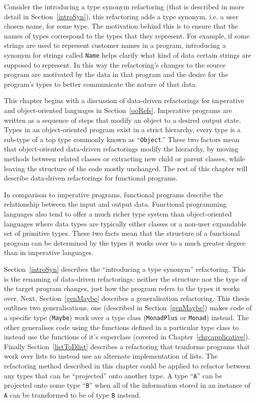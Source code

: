 Consider the introducing a type synonym refactoring (that is described in  more detail in Section~\ref{introSyn}), this refactoring adds a type synonym, i.e. a user chosen name, for some type. The motivation behind this is to ensure that the names of types correspond to the types that they represent. For example, if some strings are used to represent customer names in a program, introducing a synonym for strings called \texttt{Name} helps clarify what kind of data certain strings are supposed to represent. In this way the refactoring's changes to the source program are motivated by the data in that program and the desire for the program's types to better communicate the nature of that data.

This chapter begins with a discussion of data-driven refactorings for imperative and object-oriented languages in Section~\ref{ooRefs}. Imperative programs are written as a sequence of steps that modify an object to a desired output state. Types in an object-oriented program exist in a strict hierarchy, every type is a sub-type of a top type commonly known as ``\texttt{Object}.'' These two factors mean that object-oriented data-driven refactorings modify the hierarchy, by moving methods between related classes or extracting new child or parent classes, while leaving the structure of the code mostly unchanged. The rest of this chapter will describe data-driven refactorings for functional programs.

In comparison to imperative programs, functional programs describe the relationship between the input and output data. Functional programming languages also tend to offer a much richer type system than object-oriented languages where data types are typically either classes or a non-user expandable set of primitive types. These two facts mean that the structure of a functional program can be determined by the types it works over to a much greater degree than in imperative languages.

Section~\ref{introSyn} describes the ``introducing a type synonym'' refactoring. This is the renaming of data-driven refactorings: neither the structure nor the type of the target program changes, just how the program refers to the types it works over. Next, Section~\ref{genMaybe} describes a generalisation refactoring. This thesis outlines two generalisations, one (described in Section~\ref{genMaybe}) makes code of a specific type (\texttt{Maybe}) work over a type class (\texttt{MonadPlus} or \texttt{Monad}) instead. The other generalises code using the functions defined in a particular type class to instead use the functions of it's superclass (covered in Chapter~\ref{chp:applicative}). Finally Section~\ref{listToDlist} describes a refactoring that tranforms programs that work over lists to instead use an alternate implementation of lists. The refactoring method described in this chapter could be applied to refactor between any types that can be ``projected'' onto another type. A type ``\texttt{A}'' can be projected onto some type ``\texttt{B}'' when all of the information stored in an instance of \texttt{A} can be transformed to be of type \texttt{B} instead. 

